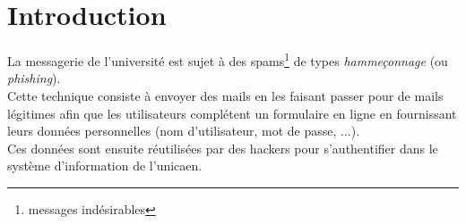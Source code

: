 \section{Introduction}
La messagerie de l'université est sujet à des spams\footnote{messages 
	indésirables} de types \emph{hammeçonnage} (ou \emph{phishing}). \\

Cette technique consiste à envoyer des mails en les faisant passer pour de 
mails légitimes afin que les utilisateurs complétent un formulaire en ligne 
en fournissant leurs données 
personnelles (nom d'utilisateur, mot de passe, ...).\\
Ces données sont ensuite réutilisées par des hackers pour s'authentifier dans
le système d'information de l'unicaen.
